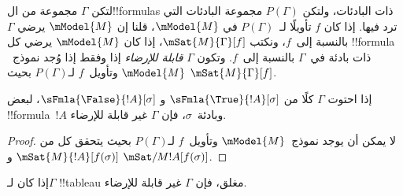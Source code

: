 \documentclass[../../../include/open-logic-section]{subfiles}
\begin{document}
\begin{defn}
  لتكن $\Gamma$ مجموعة من ال!!{formula}s ذات البادئات، ولتكن
  $P(\Gamma)$ مجموعة البادئات التي ترد فيها. إذا كان $f$ تأويلًا
  لـ~$P(\Gamma)$ في $\mModel{M}$، قلنا إن $\mModel{M}$ يرضي $\Gamma$
  بالنسبة إلى~$f$، ونكتب $\mSat{M}{\Gamma}[f]$، إذا كان $\mModel{M}$
  يرضي كل !!{formula} ذات بادئة في~$\Gamma$ بالنسبة إلى~$f$. وتكون
  $\Gamma$ \emph{قابلة للإرضاء} إذا وفقط إذا وُجد نموذج~$\mModel{M}$
  وتأويل~$f$ لـ$P(\Gamma)$ بحيث $\mSat{M}{\Gamma}[f]$.
\end{defn}

\begin{prop}
  إذا احتوت $\Gamma$ كلًا من $\sFmla{\True}{!A}[\sigma]$ و
  $\sFmla{\False}{!A}[\sigma]$، لبعض !!{formula}~$!A$ وبادئة~$\sigma$،
  فإن $\Gamma$ غير قابلة للإرضاء.
\end{prop}

\begin{proof}
  لا يمكن أن يوجد نموذج~$\mModel{M}$ وتأويل~$f$ لـ$P(\Gamma)$ بحيث
  يتحقق كل من $\mSat{M}{!A}[f(\sigma)]$ و
  $\mSat/{M}{!A}[f(\sigma)]$.
\end{proof}

\begin{thm}[السلامة]
  إذا كان لـ$\Gamma$ !!{tableau} مغلق، فإن $\Gamma$ غير قابلة للإرضاء.
\end{thm}
\end{document}
